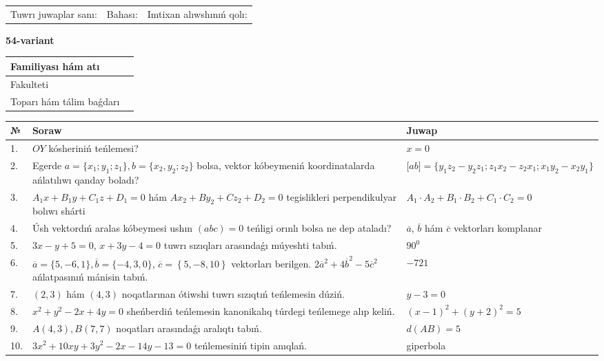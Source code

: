 \documentclass{article}
\begin{document}
\vspace{1cm}

\begin{tabular}{lll}
Tuwrı juwaplar sanı: \underline{\hspace{1.5cm}} & 
Bahası: \underline{\hspace{1.5cm}} & 
Imtixan alıwshınıń qolı: \underline{\hspace{2cm}} \\
\end{tabular}

\egroup

\newpage


\textbf{54-variant}\\

\bgroup
\def\arraystretch{1.6} %

\begin{tabular}{|m{5.7cm}|m{9.5cm}|}
\hline
Familiyası hám atı & \\
\hline
Fakulteti  & \\
\hline
Toparı hám tálim baǵdarı  & \\
\hline
\end{tabular}

\vspace{1cm}

\begin{tabular}{|m{0.7cm}|m{10cm}|m{4cm}|}
\hline
№ & Soraw & Juwap \\
\hline
1. & $OY$ kósheriniń teńlemesi? & $x=0$ \\
\hline
2. & Egerde $a=\{ x_1; y_1; z_1\}, b=\{ x_2, y_2; z_2\}$ bolsa, vektor kóbeymeniń koordinatalarda ańlatılıwı qanday boladı? &  $\lbrack ab\rbrack=\{y_1z_2-y_2z_1; z_1x_2-z_2x_1; x_1y_2-x_2y_1\}$ \\
\hline
3. & $A_1x+B_1y+C_1z+D_1=0$ hám $Ax_2+By_2+Cz_2+D_2=0$ tegislikleri perpendikulyar bolıwı shárti & $A_1\cdot A_2+B_1\cdot B_2+C_1\cdot C_2=0$ \\
\hline
4. & Úsh vektordıń aralas kóbeymesi ushın $(abc)=0$ teńligi orınlı bolsa ne dep ataladı? & $\overline{a}$, $\overline{b}$ hám $\overline{c}$ vektorları komplanar \\
\hline
5. & $3x-y+5=0$, $x+3y-4=0$ tuwrı sızıqları arasındaǵı múyeshti tabıń. & $90^{0}$ \\
\hline
6. & $\overline{a}=\{5,-6, 1 \}, \overline{b}=\{-4, 3, 0 \} $, $\overline{c}=\left\{ 5,-8, 10 \right\}$ vektorları berilgen. $2{\overline{a}}^{2}+4{\overline{b}}^{2}-5{\overline{c}}^{2}$ ańlatpasınıń mánisin tabıń. & $-721$ \\
\hline
7. & $(2, 3)$ hám $(4, 3)$ noqatlarınan ótiwshi tuwrı sızıqtıń teńlemesin dúziń. & $ y-3=0$ \\
\hline
8. & $x^{2}+y^{2}-2x+4y=0$ sheńberdiń teńlemesin kanonikalıq túrdegi teńlemege alıp keliń. & $(x-1)^{2}+(y+2)^{2}=5$ \\
\hline
9. & $A(4, 3), B(7, 7)$ noqatları arasındaǵı aralıqtı tabıń. & $d(AB)=5$ \\
\hline
10. & $3x^{2}+10xy+3y^{2}-2x-14y-13=0$ teńlemesiniń tipin anıqlań. & giperbola \\
\hline
\end{tabular}
\end{document}
